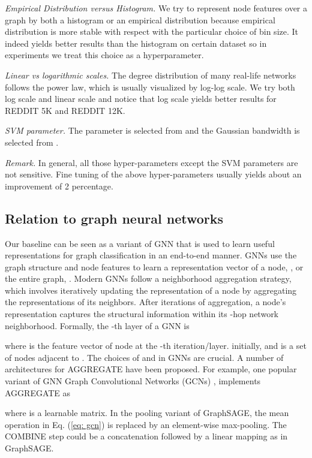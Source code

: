 \documentclass[11pt,onecolumn]{article}
\begin{document}
\emph{Empirical Distribution versus Histogram.} We try to represent node features over a graph by both a histogram or an empirical distribution because empirical distribution is more stable with respect with the particular choice of bin size. It indeed yields better results than the histogram on certain dataset so in experiments we treat this choice as a hyperparameter. 

\emph{Linear vs logarithmic scales.} The degree distribution of many real-life networks follows the power law, which is usually visualized by log-log scale. We try both log scale and linear scale and notice that log scale yields better results for REDDIT 5K and REDDIT 12K. 

\emph{SVM parameter.} The  parameter is selected from  and the Gaussian bandwidth is selected from . 

\emph{Remark.} In general, all those hyper-parameters except the SVM parameters are not sensitive.  Fine tuning of the above hyper-parameters usually yields about an improvement of 2 percentage. 


\subsection{Relation to graph neural networks }
Our baseline can be seen as a variant of GNN that is used to learn useful representations for graph classification in an end-to-end manner.  GNNs use the graph structure and node features  to learn a representation vector of a node, , or the entire graph, . Modern GNNs follow a neighborhood aggregation strategy, which involves iteratively updating the representation of a node by aggregating the representations of its neighbors. After  iterations of aggregation, a node's representation captures the structural information within its -hop network neighborhood. Formally, the -th layer of a GNN is

where  is the feature vector of node  at the -th iteration/layer.  initially, and  is a set of nodes adjacent to . The choices of  and  in GNNs are crucial. A number of architectures for AGGREGATE have been proposed. For example, one popular variant of GNN Graph Convolutional Networks (GCNs) \cite{kipf2016semi}, implements AGGREGATE as

where  is a learnable matrix. In the pooling variant of GraphSAGE\cite{hamilton2017inductive}, the mean operation in Eq. (\ref{eq: gcn}) is replaced by an element-wise max-pooling. The COMBINE step could be a concatenation followed by a linear mapping  as in GraphSAGE. 
\end{document}
